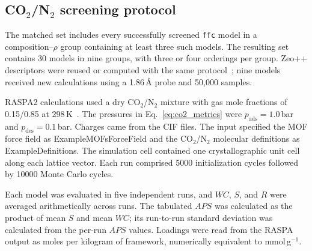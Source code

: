 \documentclass[a5paper, 10pt]{article}
\begin{document}
\subsection{CO$_2$/N$_2$ screening protocol}
\label{app:adsorption_screening}

The matched set includes every successfully screened \texttt{ffc} model in a composition--$\rho$ group containing at least three such models. The resulting set contains 30 models in nine groups, with three or four orderings per group. Zeo++ descriptors were reused or computed with the same protocol~\cite{willems2012algorithms}; nine models received new calculations using a 1.86\,\AA{} probe and 50{,}000 samples.

RASPA2 calculations used a dry CO$_2$/N$_2$ mixture with gas mole fractions of 0.15/0.85 at 298\,K~\cite{dubbeldam2016raspa,altintas2018database}. The pressures in Eq.~\ref{eq:co2_metrics} were $p_{\mathrm{ads}}=1.0$\,bar and $p_{\mathrm{des}}=0.1$\,bar. Charges came from the CIF files. The input specified the MOF force field as ExampleMOFsForceField and the CO$_2$/N$_2$ molecular definitions as ExampleDefinitions. The simulation cell contained one crystallographic unit cell along each lattice vector. Each run comprised 5000 initialization cycles followed by 10000 Monte Carlo cycles.

Each model was evaluated in five independent runs, and $WC$, $S$, and $R$ were averaged arithmetically across runs. The tabulated $APS$ was calculated as the product of mean $S$ and mean $WC$; its run-to-run standard deviation was calculated from the per-run $APS$ values. Loadings were read from the RASPA output as moles per kilogram of framework, numerically equivalent to mmol\,g$^{-1}$.
\end{document}

